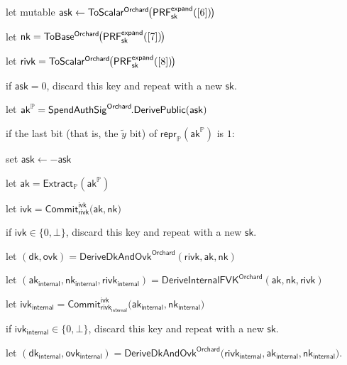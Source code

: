 \documentclass{article}
\theoremstyle{labelledtheorem} %
\newcommand{\tab}{\hspace{1.8em}}
\newcommand{\mathsanstype}[1]{\ensuremath{\mathsf{#1}}}
\newcommand{\mathsansvartype}{\mathsanstype}
\newcommand{\subprotocoltype}{\mathsansvartype}
\newcommand{\OrchardProto}{\subprotocoltype{Orchard}}
\newcommand{\ToScalar}[1]{\mathsf{ToScalar^{#1\kern-0.1em}}}
\newcommand{\ToBase}[1]{\mathsf{ToBase^{#1\kern-0.1em}}}
\newcommand{\setof}[1]{\{{#1}\}}
\newcommand{\InViewingKey}{\mathsf{ivk}}
\newcommand{\Internal}[1]{{#1}_{\mathsf{internal}}}
\newcommand{\SpendingKey}{\mathsf{sk}}
\newcommand{\AuthSignPrivate}{\mathsf{ask}}
\newcommand{\AuthSignPublic}{\mathsf{ak}}
\newcommand{\AuthSignPublicPoint}{\mathsf{ak}^\GroupP}
\newcommand{\NullifierKey}{\mathsf{nk}}
\newcommand{\OutViewingKey}{\mathsf{ovk}}
\newcommand{\DiversifierKey}{\mathsf{dk}}
\newcommand{\DeriveInternalFVKOrchard}{\mathsf{DeriveInternalFVK}^{\OrchardProto}}
\newcommand{\DeriveDkAndOvkOrchard}{\mathsf{DeriveDkAndOvk}^{\OrchardProto}}
\newcommand{\PRF}[2]{\mathsf{{PRF}^{#2}_\mathnormal{#1}}}
\newcommand{\PRFexpand}[1]{\PRF{#1}{expand}}
\newcommand{\CommitIvkAlg}{\mathsf{Commit}^{\InViewingKey}}
\newcommand{\CommitIvk}[1]{\CommitIvkAlg_{#1}}
\newcommand{\CommitIvkRand}{\mathsf{rivk}}
\newcommand{\SpendAuthSig}[1]{\mathsf{SpendAuthSig}^\mathsf{#1\kern-0.1em}}
\newcommand{\SpendAuthSigDerivePublic}[1]{\SpendAuthSig{#1}\mathsf{.DerivePublic}}
\newcommand{\Extract}{\mathsf{Extract}}
\newcommand{\GroupP}{\mathbb{P}}
\newcommand{\reprP}{\repr_{\GroupP}}
\newcommand{\ExtractP}{\Extract_{\GroupP}}
\newcommand{\repr}{\mathsf{repr}}
\begin{document}
{\begin{algorithm}
  \item let mutable $\AuthSignPrivate \leftarrow \ToScalar{Orchard}\big(\PRFexpand{\SpendingKey}([6])\kern-0.1em\big)$
        \vspace{-0.4ex}
  \item let $\NullifierKey = \ToBase{Orchard}\big(\PRFexpand{\SpendingKey}([7])\kern-0.1em\big)$
        \vspace{-0.4ex}
  \item let $\CommitIvkRand = \ToScalar{Orchard}\big(\PRFexpand{\SpendingKey}([8])\kern-0.1em\big)$
        \vspace{-0.3ex}
  \item if $\AuthSignPrivate = 0$, discard this key and repeat with a new $\SpendingKey$.
        \vspace{-0.3ex}
  \item let $\AuthSignPublicPoint = \SpendAuthSigDerivePublic{Orchard}(\AuthSignPrivate)$
        \vspace{-0.3ex}
  \item if the last bit (that is, the $\tilde{y}$ bit) of $\reprP(\AuthSignPublicPoint)$ is $1$:
        \vspace{-0.4ex}
  \item \tab set $\AuthSignPrivate \leftarrow -\AuthSignPrivate$
        \vspace{0.2ex}
  \item let $\AuthSignPublic = \ExtractP(\AuthSignPublicPoint)$
        \vspace{-0.4ex}
  \item let $\InViewingKey = \CommitIvk{\CommitIvkRand}\big(\AuthSignPublic, \NullifierKey\big)$
        \vspace{-0.2ex}
  \item if $\InViewingKey \in \setof{0, \bot}$, discard this key and repeat with a new $\SpendingKey$.
        \vspace{-0.2ex}
  \item let $(\DiversifierKey, \OutViewingKey) = \DeriveDkAndOvkOrchard(\CommitIvkRand, \AuthSignPublic, \NullifierKey)$
        \vspace{-0.4ex}
  \item let $(\Internal{\AuthSignPublic}, \Internal{\NullifierKey}, \Internal{\CommitIvkRand}) = \DeriveInternalFVKOrchard(\AuthSignPublic, \NullifierKey, \CommitIvkRand)$
        \vspace{-0.3ex}
  \item let $\Internal{\InViewingKey} = \CommitIvk{\Internal{\CommitIvkRand}}\big(\Internal{\AuthSignPublic}, \Internal{\NullifierKey}\big)$
        \vspace{-0.2ex}
  \item if $\Internal{\InViewingKey} \in \setof{0, \bot}$, discard this key and repeat with a new $\SpendingKey$.
        \vspace{-0.2ex}
  \item let $(\Internal{\DiversifierKey}, \Internal{\OutViewingKey}) = \DeriveDkAndOvkOrchard\big(\Internal{\CommitIvkRand}, \Internal{\AuthSignPublic}, \Internal{\NullifierKey}\big)$.
\end{algorithm}

}
\end{document}
